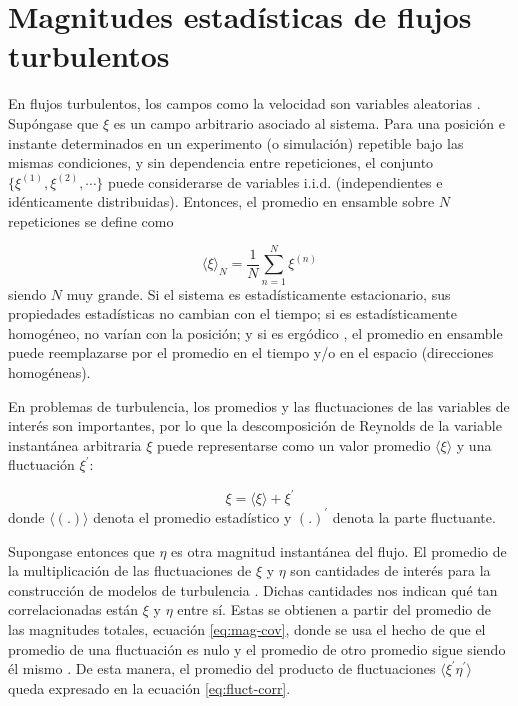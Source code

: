 \section{Magnitudes estadísticas de flujos turbulentos} \label{sec:mag-stat}

En flujos turbulentos, los campos como la velocidad son variables aleatorias \linebreak \cite{pope2001turbulent}. Supóngase que $\xi$ es un campo arbitrario asociado al sistema. Para una posición e instante determinados en un experimento (o simulación) repetible bajo las mismas condiciones, y sin dependencia entre repeticiones, el conjunto $\lbrace \xi^{(1)}, \xi^{(2)}, \cdots \rbrace$ puede considerarse de variables i.i.d. (independientes e idénticamente distribuidas). Entonces, el promedio en ensamble sobre $N$ repeticiones se define como 

\begin{equation*}
\langle \xi \rangle_N = \frac{1}{N} \sum^N_{n=1} \xi^{(n)} 
\end{equation*}
siendo $N$ muy grande. Si el sistema es estadísticamente estacionario, sus propiedades estadísticas no cambian con el tiempo; si es estadísticamente homogéneo, no varían con la posición; y si es ergódico \cite{moser2003}, el promedio en ensamble puede reemplazarse por el promedio en el tiempo y/o en el espacio (direcciones homogéneas). 

En problemas de turbulencia, los promedios y las fluctuaciones de las variables de interés son importantes, por lo que la descomposición de Reynolds \cite{pope2001turbulent, kundu} de la variable instantánea arbitraria $\xi$ puede representarse como un valor promedio $\langle \xi \rangle$ y una fluctuación $\xi^{\prime}$:

$$\xi = \langle \xi \rangle + \xi^{\prime}$$
donde $\langle (\text{.}) \rangle$ denota el promedio estadístico y $(\text{.})^{\prime}$ denota la parte fluctuante. 

Supongase entonces que $\eta$ es otra magnitud instantánea del flujo. El promedio de la multiplicación  de las fluctuaciones de $\xi$ y $\eta$ son cantidades de interés para la construcción de modelos de turbulencia \cite{pope2001turbulent}. Dichas cantidades nos indican qué tan correlacionadas están $\xi$ y $\eta$ entre sí. Estas se obtienen a partir del promedio de las magnitudes totales, ecuación \ref{eq:mag-cov}, donde se usa el hecho de que el promedio de una fluctuación es nulo y el promedio de otro promedio sigue siendo él mismo \cite{pope2001turbulent}. De esta manera, el promedio del producto de fluctuaciones $\langle \xi^{\prime} \eta^{\prime} \rangle$ queda expresado en la ecuación \ref{eq:fluct-corr}.


